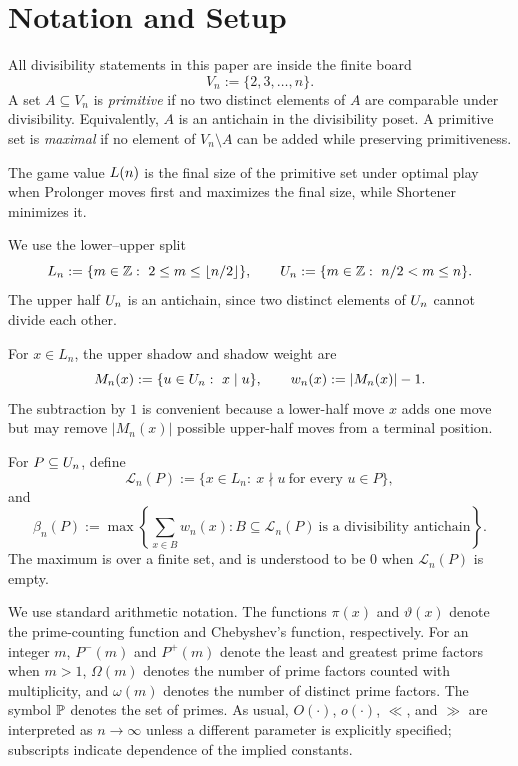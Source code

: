 \section{Notation and Setup}\label{sec:notation}

All divisibility statements in this paper are inside the finite board
\[
  V_n:=\{2,3,\ldots,n\}.
\]
A set $A\subseteq V_n$ is \emph{primitive} if no two distinct elements of $A$
are comparable under divisibility.  Equivalently, $A$ is an antichain in the
divisibility poset.  A primitive set is \emph{maximal} if no element of
$V_n\setminus A$ can be added while preserving primitiveness.

The game value $L(n)$ is the final size of the primitive set under optimal
play when Prolonger moves first and maximizes the final size, while Shortener
minimizes it.

We use the lower--upper split
\[
  L_n:=\{m\in\mathbb Z:\ 2\le m\le \lfloor n/2\rfloor\},
  \qquad
  U_n:=\{m\in\mathbb Z:\ n/2<m\le n\}.
\]
The upper half $U_n$ is an antichain, since two distinct elements of $U_n$
cannot divide each other.

For $x\in L_n$, the upper shadow and shadow weight are
\[
  M_n(x):=\{u\in U_n:\ x\mid u\},
  \qquad
  w_n(x):=|M_n(x)|-1.
\]
The subtraction by $1$ is convenient because a lower-half move $x$ adds one
move but may remove $|M_n(x)|$ possible upper-half moves from a terminal
position.

For $P\subseteq U_n$, define
\[
  \mathcal L_n(P):=\{x\in L_n:\ x\nmid u\ \text{for every }u\in P\},
\]
and
\[
  \beta_n(P):=
  \max\left\{\sum_{x\in B}w_n(x):
    B\subseteq\mathcal L_n(P)\ \text{is a divisibility antichain}\right\}.
\]
The maximum is over a finite set, and is understood to be $0$ when
$\mathcal L_n(P)$ is empty.

We use standard arithmetic notation.  The functions $\pi(x)$ and
$\vartheta(x)$ denote the prime-counting function and Chebyshev's function,
respectively.  For an integer $m$, $P^-(m)$ and $P^+(m)$ denote the least and
greatest prime factors when $m>1$, $\Omega(m)$ denotes the number of prime
factors counted with multiplicity, and $\omega(m)$ denotes the number of
distinct prime factors.  The symbol $\mathbb{P}$ denotes the set of primes.  As usual,
$O(\cdot)$, $o(\cdot)$, $\ll$, and $\gg$ are interpreted as $n\to\infty$ unless
a different parameter is explicitly specified; subscripts indicate dependence
of the implied constants.
